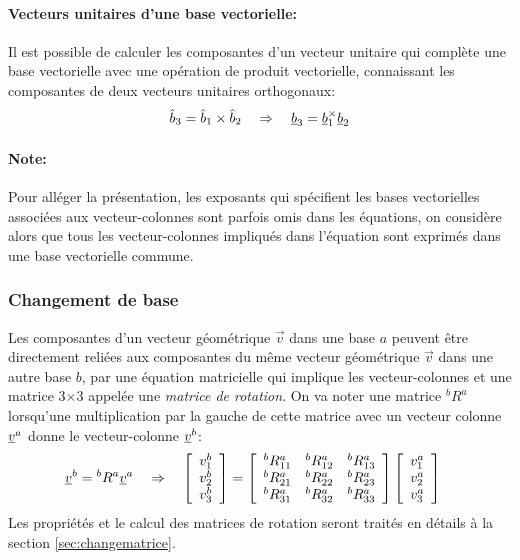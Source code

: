\paragraph{Vecteurs unitaires d'une base vectorielle:}
Il est possible de calculer les composantes d'un vecteur unitaire qui complète une base vectorielle avec une opération de produit vectorielle, connaissant les composantes de deux vecteurs unitaires orthogonaux: 
\begin{equation}
\hat{b}_3 = \hat{b}_1 \times \hat{b}_2  \quad \Rightarrow \quad   \underline{b}_3 = \underline{b}_1^{\times}\underline{b}_2
\end{equation} 

\paragraph{Note:}
Pour alléger la présentation, les exposants qui spécifient les bases vectorielles associées aux vecteur-colonnes sont parfois omis dans les équations, on considère alors que tous les vecteur-colonnes impliqués dans l'équation sont exprimés dans une base vectorielle commune.


\subsubsection{Changement de base}
%
Les composantes d'un vecteur géométrique $\vec{v}$ dans une base $a$ peuvent être directement reliées aux composantes du même vecteur géométrique $\vec{v}$ dans une autre base $b$, par une équation matricielle qui implique les vecteur-colonnes et une matrice 3$\times$3 appelée une \textit{matrice de rotation}. On va noter une matrice $^bR^a$ lorsqu'une multiplication par la gauche de cette matrice avec un vecteur colonne $\underline{v}^a$ donne le vecteur-colonne $\underline{v}^b$:
\begin{align}
\underline{v}^b &= {}^bR^a \underline{v}^a  \quad \Rightarrow \quad
 \left[ \begin{array}{c} v_1^b \\ v_2^b \\ v_3^b  \end{array} \right]
=
\left[ \begin{array}{c c c}
	{}^bR^a_{11} & {}^bR^a_{12} & {}^bR^a_{13} \\ 
	{}^bR^a_{21} & {}^bR^a_{22} & {}^bR^a_{23} \\
	{}^bR^a_{31} & {}^bR^a_{32} & {}^bR^a_{33}
\end{array}  \right]
 \left[ \begin{array}{c} v_1^a \\ v_2^a \\ v_3^a  \end{array} \right]
\label{eq:basechange1}
\end{align} 
Les propriétés et le calcul des matrices de rotation seront traités en détails à la section \ref{sec:changematrice}.



